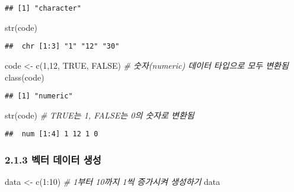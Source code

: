 \documentclass[
]{article}
\newenvironment{Shaded}{\begin{snugshade}}{\end{snugshade}}
\newcommand{\CommentTok}[1]{\textcolor[rgb]{0.56,0.35,0.01}{\textit{#1}}}
\newcommand{\ConstantTok}[1]{\textcolor[rgb]{0.00,0.00,0.00}{#1}}
\newcommand{\DecValTok}[1]{\textcolor[rgb]{0.00,0.00,0.81}{#1}}
\newcommand{\FunctionTok}[1]{\textcolor[rgb]{0.00,0.00,0.00}{#1}}
\newcommand{\NormalTok}[1]{#1}
\newcommand{\OtherTok}[1]{\textcolor[rgb]{0.56,0.35,0.01}{#1}}
\newcommand{\SpecialCharTok}[1]{\textcolor[rgb]{0.00,0.00,0.00}{#1}}
\begin{document}
\begin{verbatim}
## [1] "character"
\end{verbatim}

\begin{Shaded}
\begin{Highlighting}[]
\FunctionTok{str}\NormalTok{(code)}
\end{Highlighting}
\end{Shaded}

\begin{verbatim}
##  chr [1:3] "1" "12" "30"
\end{verbatim}

\begin{Shaded}
\begin{Highlighting}[]
\NormalTok{code }\OtherTok{\textless{}{-}} \FunctionTok{c}\NormalTok{(}\DecValTok{1}\NormalTok{,}\DecValTok{12}\NormalTok{, }\ConstantTok{TRUE}\NormalTok{, }\ConstantTok{FALSE}\NormalTok{)  }\CommentTok{\# 숫자(numeric) 데이터 타입으로 모두 변환됨}
\FunctionTok{class}\NormalTok{(code) }
\end{Highlighting}
\end{Shaded}

\begin{verbatim}
## [1] "numeric"
\end{verbatim}

\begin{Shaded}
\begin{Highlighting}[]
\FunctionTok{str}\NormalTok{(code)                     }\CommentTok{\# TRUE는 1, FALSE는 0의 숫자로 변환됨}
\end{Highlighting}
\end{Shaded}

\begin{verbatim}
##  num [1:4] 1 12 1 0
\end{verbatim}

\hypertarget{uxbca1uxd130-uxb370uxc774uxd130-uxc0dduxc131}{%
\subsubsection{2.1.3 벡터 데이터
생성}\label{uxbca1uxd130-uxb370uxc774uxd130-uxc0dduxc131}}

\begin{Shaded}
\begin{Highlighting}[]
\NormalTok{data }\OtherTok{\textless{}{-}} \FunctionTok{c}\NormalTok{(}\DecValTok{1}\SpecialCharTok{:}\DecValTok{10}\NormalTok{)  }\CommentTok{\# 1부터 10까지 1씩 증가시켜 생성하기}
\NormalTok{data}
\end{Highlighting}
\end{Shaded}
\end{document}
